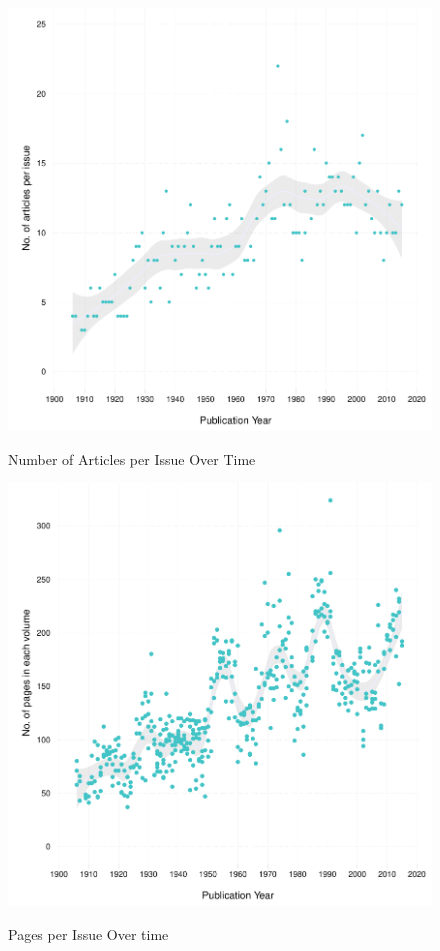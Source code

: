\documentclass[12pt]{article}
\begin{document}
\begin{figure}[htbp]
\centering
\caption{Number of Articles per Issue Over Time}
\includegraphics[scale=.85]{../figs/articles_per_issue_over_time.pdf}
\label{fig:narticles}
\end{figure}

\begin{figure}[htbp]
\centering
\caption{Pages per Issue Over time}
\includegraphics[scale=.85]{../figs/pages_per_issue_over_time.pdf}
\label{fig:issue}
\end{figure}
\end{document}
